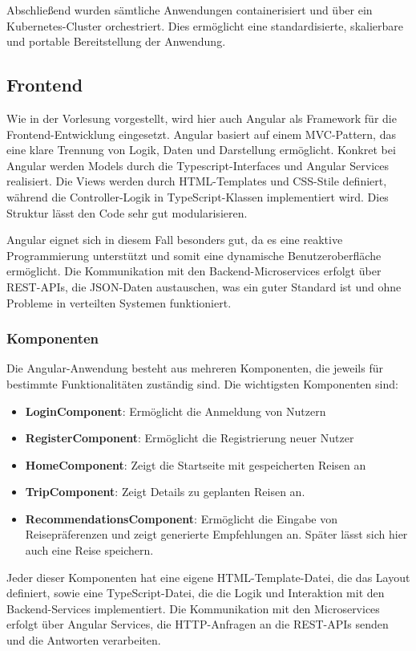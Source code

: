 Abschließend wurden sämtliche Anwendungen containerisiert und über ein Kubernetes-Cluster orchestriert. Dies ermöglicht eine standardisierte, skalierbare und portable Bereitstellung der Anwendung.


\subsection{Frontend}

Wie in der Vorlesung vorgestellt, wird hier auch Angular als Framework für die Frontend-Entwicklung eingesetzt. Angular basiert auf einem MVC-Pattern, das eine klare Trennung von Logik, Daten und Darstellung ermöglicht.
Konkret bei Angular werden Models durch die Typescript-Interfaces und Angular Services realisiert. Die Views werden durch HTML-Templates und CSS-Stile definiert, während die Controller-Logik in TypeScript-Klassen implementiert wird. Dies Struktur lässt den Code sehr gut modularisieren.

Angular eignet sich in diesem Fall besonders gut, da es eine reaktive Programmierung unterstützt und somit eine dynamische Benutzeroberfläche ermöglicht. Die Kommunikation mit den Backend-Microservices erfolgt über REST-APIs, die JSON-Daten austauschen, was ein guter Standard ist und ohne Probleme in verteilten Systemen funktioniert.

\subsubsection{Komponenten}
Die Angular-Anwendung besteht aus mehreren Komponenten, die jeweils für bestimmte Funktionalitäten zuständig sind. Die wichtigsten Komponenten sind:

\begin{itemize}
  \item \textbf{LoginComponent}: Ermöglicht die Anmeldung von Nutzern
  \item \textbf{RegisterComponent}: Ermöglicht die Registrierung neuer Nutzer
  \item \textbf{HomeComponent}: Zeigt die Startseite mit gespeicherten Reisen an
  \item \textbf{TripComponent}: Zeigt Details zu geplanten Reisen an.
  \item \textbf{RecommendationsComponent}: Ermöglicht die Eingabe von Reisepräferenzen und zeigt generierte Empfehlungen an. Später lässt sich hier auch eine Reise speichern.
\end{itemize}

Jeder dieser Komponenten hat eine eigene HTML-Template-Datei, die das Layout definiert, sowie eine TypeScript-Datei, die die Logik und Interaktion mit den Backend-Services implementiert. Die Kommunikation mit den Microservices erfolgt über Angular Services, die HTTP-Anfragen an die REST-APIs senden und die Antworten verarbeiten.


